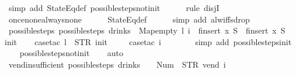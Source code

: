 \begin{isabellebody}
\ {\isacharparenleft}simp\ add{\isacharcolon}\ StateEq{\isacharunderscore}def\ possible{\isacharunderscore}steps{\isacharunderscore}not{\isacharunderscore}init{\isacharparenright}\isanewline
\ \ \ \ \isamarkupfalse%
\ {\isacharparenleft}rule\ disjI{}{\isacharparenright}\isanewline
\ \ \ \ \isamarkupfalse%
\ once{\isacharunderscore}none{\isacharunderscore}always{\isacharunderscore}none\isanewline
\ \ \ \ \isamarkupfalse%
\ StateEq{\isacharunderscore}def\isanewline
\ \ \ \ \isamarkupfalse%
\ {\isacharparenleft}simp\ add{\isacharcolon}\ alw{\isacharunderscore}iff{\isacharunderscore}sdrop{\isacharparenright}\isanewline
{}\isamarkupfalse%
%
\endisatagproof
{\isafoldproof}%
%
\isadelimproof
\isanewline
%
\endisadelimproof
\isanewline
{}\isamarkupfalse%
\ possible{\isacharunderscore}steps{\isacharunderscore}{}{\isacharcolon}\ {\isachardoublequoteopen}possible{\isacharunderscore}steps\ drinks\ {}\ Map{\isachardot}empty\ l\ i\ {\isacharequal}\ finsert\ x\ S{\isacharprime}\ {\isasymLongrightarrow}\ finsert\ x\ S{\isacharprime}\ {\isacharequal}\ {\isacharbraceleft}{\isacharbar}{\isacharparenleft}{}{\isacharcomma}\ init{\isacharparenright}{\isacharbar}{\isacharbraceright}{\isachardoublequoteclose}\isanewline
%
\isadelimproof
\ \ %
\endisadelimproof
%
\isatagproof
{}\isamarkupfalse%
\ {\isacharparenleft}case{\isacharunderscore}tac\ {\isachardoublequoteopen}l\ {\isacharequal}\ STR\ {\isacharprime}{\isacharprime}init{\isacharprime}{\isacharprime}{\isachardoublequoteclose}{\isacharparenright}\isanewline
\ \ \ \isamarkupfalse%
\ {\isacharparenleft}case{\isacharunderscore}tac\ {\isachardoublequoteopen}i\ {\isacharequal}\ {\isacharbrackleft}{\isacharbrackright}{\isachardoublequoteclose}{\isacharparenright}\isanewline
\ \ \ \ \isamarkupfalse%
\ {\isacharparenleft}simp\ add{\isacharcolon}\ possible{\isacharunderscore}steps{\isacharunderscore}init{\isacharparenright}\isanewline
\ \ \isamarkupfalse%
\ possible{\isacharunderscore}steps{\isacharunderscore}not{\isacharunderscore}init\isanewline
\ \ \isamarkupfalse%
\ auto%
\endisatagproof
{\isafoldproof}%
%
\isadelimproof
\isanewline
%
\endisadelimproof
\isanewline
{}\isamarkupfalse%
\ vend{\isacharunderscore}insufficient{\isacharcolon}\ {\isachardoublequoteopen}possible{\isacharunderscore}steps\ drinks\ {}\ {\isacharless}{}\ {\isacharcolon}{\isacharequal}\ Num\ {}{\isachargreater}\ STR\ {\isacharprime}{\isacharprime}vend{\isacharprime}{\isacharprime}\ i\ {\isacharequal}\ {\isacharbraceleft}{\isacharbar}{\isacharbar}{\isacharbraceright}{\isachardoublequoteclose}\isanewline

\end{isabellebody}
